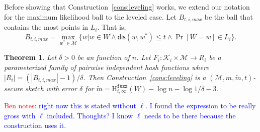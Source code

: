 \documentclass[11pt]{article}
\newcommand{\consref}[1]{\mbox{Construction~\ref{#1}}}
\newcommand{\dis}{\ensuremath{\mathsf{dis}}}
\newcommand{\Hfuzz}{\mathrm{H}^{\mathtt{fuzz}}_{t,\infty}}
\newtheorem{theorem}{Theorem}[section]
\newcommand{\authnote}[2]{{\textcolor{red}{\textsf{#1 notes: }\textcolor{blue}{ #2}}\marginpar{\textcolor{red}{\textbf{!!!!!}}}}}
\newcommand{\authnote}[2]{}
\newcommand{\bnote}[1]{{\authnote{Ben}{#1}}}
\begin{document}
\noindent Before showing that \consref{cons:leveling} works, we extend our notation for the maximum likelihood ball to the leveled case.  Let $B_{t, i, max}$ be the ball that contains the most points in $L_i$.  That is,
\[
B_{t, i, max} = \max_{w^* \in \mathcal{M}} \{w | w\in W \wedge \dis(w, w^*)\le t \wedge \Pr[W=w]\in L_i\}.
\]
\begin{theorem}
\label{thm:layered hashing}
Let $\delta>0$ be an function of $n$.  Let $F_i: \mathcal{K}_i \times \mathcal{M}\rightarrow R_i$ be a parameterized family of pairwise independent hash functions where $|R_i| = (|B_{t, i, max}|-1) /\delta$.  Then \consref{cons:leveling} is a $(\mathcal{M}, m, \tilde{m}, t)$-secure sketch with error $\delta$ for $\tilde{m} = \Hfuzz(W) - \log n - \log 1/\delta - 3$.
\end{theorem}
\bnote{right now this is stated without $\ell$.  I found the expression to be really gross with $\ell$ included.  Thoughts?  I know $\ell$ needs to be there because the construction uses it.}
\end{document}
